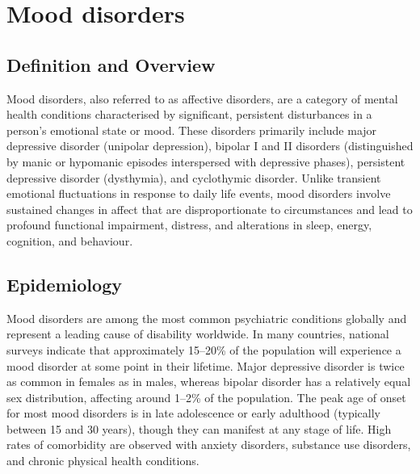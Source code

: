 \chapter{Mood disorders}

\section*{Definition and Overview}
Mood disorders, also referred to as affective disorders, are a category of mental health conditions characterised by significant, persistent disturbances in a person's emotional state or mood. These disorders primarily include major depressive disorder (unipolar depression), bipolar I and II disorders (distinguished by manic or hypomanic episodes interspersed with depressive phases), persistent depressive disorder (dysthymia), and cyclothymic disorder. Unlike transient emotional fluctuations in response to daily life events, mood disorders involve sustained changes in affect that are disproportionate to circumstances and lead to profound functional impairment, distress, and alterations in sleep, energy, cognition, and behaviour.

\section*{Epidemiology}
Mood disorders are among the most common psychiatric conditions globally and represent a leading cause of disability worldwide. In many countries, national surveys indicate that approximately 15--20\% of the population will experience a mood disorder at some point in their lifetime. Major depressive disorder is twice as common in females as in males, whereas bipolar disorder has a relatively equal sex distribution, affecting around 1--2\% of the population. The peak age of onset for most mood disorders is in late adolescence or early adulthood (typically between 15 and 30 years), though they can manifest at any stage of life. High rates of comorbidity are observed with anxiety disorders, substance use disorders, and chronic physical health conditions.

